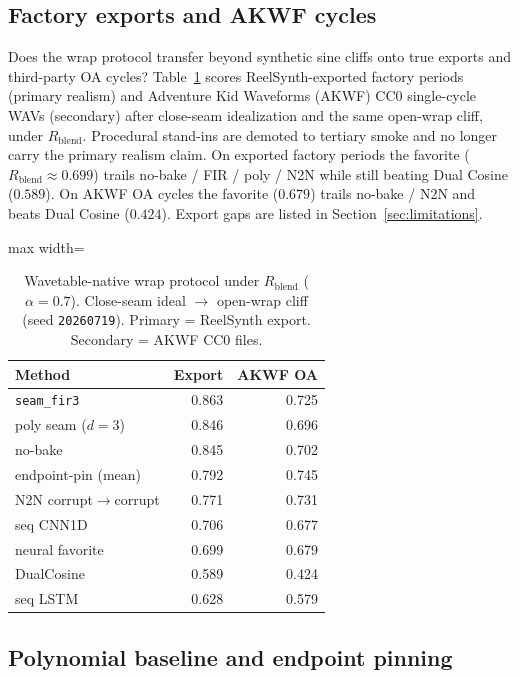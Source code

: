 \subsection{Factory exports and AKWF cycles}
\label{sec:real-wt}

Does the wrap protocol transfer beyond synthetic sine cliffs onto true exports and third-party OA cycles?
Table~\ref{tab:real-wt} scores ReelSynth-exported factory periods (primary realism) and Adventure Kid Waveforms (AKWF) CC0 single-cycle WAVs (secondary) after close-seam idealization and the same open-wrap cliff, under $R_{\mathrm{blend}}$.
Procedural stand-ins are demoted to tertiary smoke and no longer carry the primary realism claim.
On exported factory periods the favorite ($R_{\mathrm{blend}}{\approx}0.699$) trails no-bake / FIR / poly / N2N while still beating Dual Cosine ($0.589$).
On AKWF OA cycles the favorite ($0.679$) trails no-bake / N2N and beats Dual Cosine ($0.424$).
Export gaps are listed in Section~\ref{sec:limitations}.

\begin{table}[t]
  \centering
  \caption{Wavetable-native wrap protocol under $R_{\mathrm{blend}}$ ($\alpha{=}0.7$). Close-seam ideal $\to$ open-wrap cliff (seed \texttt{20260719}). Primary = ReelSynth export. Secondary = AKWF CC0 files.}
  \label{tab:real-wt}
  \setlength{\tabcolsep}{6pt}
  \begin{adjustbox}{max width=\columnwidth}
\begin{tabular}{@{}lrr@{}}
    \toprule
    Method & Export & AKWF OA \\
    \midrule
    \texttt{seam\_fir3} & 0.863 & 0.725 \\
    poly seam ($d{=}3$) & 0.846 & 0.696 \\
    no-bake & 0.845 & 0.702 \\
    endpoint-pin (mean) & 0.792 & 0.745 \\
    N2N corrupt$\to$corrupt & 0.771 & 0.731 \\
    seq CNN1D & 0.706 & 0.677 \\
    neural favorite & 0.699 & 0.679 \\
    DualCosine & 0.589 & 0.424 \\
    seq LSTM & 0.628 & 0.579 \\
    \bottomrule
  \end{tabular}
\end{adjustbox}
\end{table}

\subsection{Polynomial baseline and endpoint pinning}
\label{sec:poly-jump}

